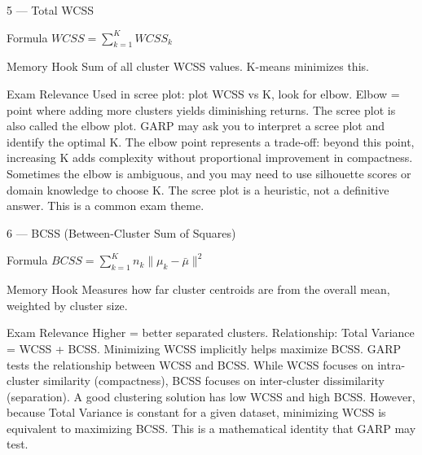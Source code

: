 \documentclass[aspectratio=169,8pt]{beamer}
\begin{document}
	\begin{frame}{5 --- Total WCSS}
		\begin{block}{Formula}
			$WCSS = \sum_{k=1}^{K} WCSS_k$
		\end{block}
		\begin{block}{Memory Hook}
			Sum of all cluster WCSS values. K-means minimizes this.
		\end{block}
		\begin{block}{Exam Relevance}
			Used in scree plot: plot WCSS vs K, look for elbow. Elbow = point where adding more clusters yields diminishing returns. The scree plot is also called the elbow plot. GARP may ask you to interpret a scree plot and identify the optimal K. The elbow point represents a trade-off: beyond this point, increasing K adds complexity without proportional improvement in compactness. Sometimes the elbow is ambiguous, and you may need to use silhouette scores or domain knowledge to choose K. The scree plot is a heuristic, not a definitive answer. This is a common exam theme.
		\end{block}
	\end{frame}
	
	\begin{frame}{6 --- BCSS (Between-Cluster Sum of Squares)}
		\begin{block}{Formula}
			$BCSS = \sum_{k=1}^{K} n_k \|\mu_k - \bar{\mu}\|^2$
		\end{block}
		\begin{block}{Memory Hook}
			Measures how far cluster centroids are from the overall mean, weighted by cluster size.
		\end{block}
		\begin{block}{Exam Relevance}
			Higher = better separated clusters. Relationship: Total Variance = WCSS + BCSS. Minimizing WCSS implicitly helps maximize BCSS. GARP tests the relationship between WCSS and BCSS. While WCSS focuses on intra-cluster similarity (compactness), BCSS focuses on inter-cluster dissimilarity (separation). A good clustering solution has low WCSS and high BCSS. However, because Total Variance is constant for a given dataset, minimizing WCSS is equivalent to maximizing BCSS. This is a mathematical identity that GARP may test.
		\end{block}
	\end{frame}
	
\end{document}
